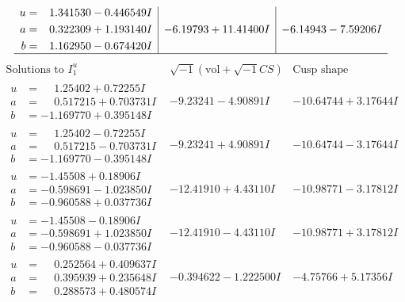 \documentclass[1p]{elsarticle_modified}
\theoremstyle{definition}
\newcommand{\I}{\sqrt{-1}}
\begin{document}
$$\begin{array}{c|c|c}
\begin{aligned}
u &= \phantom{-}1.341530 - 0.446549 I \\
a &= \phantom{-}0.322309 + 1.193140 I \\
b &= \phantom{-}1.162950 - 0.674420 I\end{aligned}
 & -6.19793 + 11.41400 I & -6.14943 - 7.59206 I\\
 \hline 
 \end{array}$$\newpage$$\begin{array}{c|c|c}  
\text{Solutions to }I^u_{1}& \I (\text{vol} + \sqrt{-1}CS) & \text{Cusp shape}\\
 \hline 
\begin{aligned}
u &= \phantom{-}1.25402 + 0.72255 I \\
a &= \phantom{-}0.517215 + 0.703731 I \\
b &= -1.169770 + 0.395148 I\end{aligned}
 & -9.23241 - 4.90891 I & -10.64744 + 3.17644 I \\ \hline\begin{aligned}
u &= \phantom{-}1.25402 - 0.72255 I \\
a &= \phantom{-}0.517215 - 0.703731 I \\
b &= -1.169770 - 0.395148 I\end{aligned}
 & -9.23241 + 4.90891 I & -10.64744 - 3.17644 I \\ \hline\begin{aligned}
u &= -1.45508 + 0.18906 I \\
a &= -0.598691 - 1.023850 I \\
b &= -0.960588 + 0.037736 I\end{aligned}
 & -12.41910 + 4.43110 I & -10.98771 - 3.17812 I \\ \hline\begin{aligned}
u &= -1.45508 - 0.18906 I \\
a &= -0.598691 + 1.023850 I \\
b &= -0.960588 - 0.037736 I\end{aligned}
 & -12.41910 - 4.43110 I & -10.98771 + 3.17812 I \\ \hline\begin{aligned}
u &= \phantom{-}0.252564 + 0.409637 I \\
a &= \phantom{-}0.395939 + 0.235648 I \\
b &= \phantom{-}0.288573 + 0.480574 I\end{aligned}
 & -0.394622 - 1.222500 I & -4.75766 + 5.17356 I \\ \hline\begin{aligned}

\end{aligned}
\end{array}$$
\end{document}
